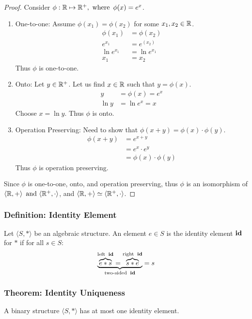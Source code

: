 \begin{proof}
    Consider $\phi: \mathbb{R} \mapsto \mathbb{R}^+, \operatorname{~\text{where}~} \phi(x) = e^x$.
    \begin{enumerate}
        \item One-to-one: Assume $\phi(x_1) = \phi(x_2)$ for some $x_1,x_2 \in \mathbb{R}$.
        \begin{align*}
            \phi(x_1) & = \phi(x_2) \\
            e^{x_1} & = e^(x_2) \\
            \ln e^{x_1} & = \ln e^{x_1} \\
            x_1 & = x_2
        \end{align*}
        Thus $\phi$ is one-to-one.
        \item Onto: Let $y \in \mathbb{R}^+$. Let us find $x \in \mathbb{R}$ such that $y = \phi(x)$.
        \begin{align*}
            y & = \phi(x) = e^x \\
            \ln y & = \ln e^x = x
        \end{align*}
        Choose $x = \ln y$. Thus $\phi$ is onto.
        \item Operation Preserving: Need to show that $\phi(x + y) = \phi(x) \cdot \phi(y)$.
        \begin{align*}
            \phi(x+y) & = e^{x+y} \\
            & = e^x \cdot e^y \\
            & = \phi(x) \cdot \phi(y)
        \end{align*}
        Thus $\phi$ is operation preserving.
    \end{enumerate}
    Since $\phi$ is one-to-one, onto, and operation preserving, thus $\phi$ is an isomorphism of $\langle \mathbb{R},+\rangle \operatorname{~\text{and}~} \langle \mathbb{R}^+, \cdot \rangle$, and $\langle \mathbb{R},+\rangle \simeq \langle \mathbb{R}^+, \cdot \rangle$.
\end{proof}

\subsubsection*{Definition: Identity Element}
Let $\langle S, * \rangle$ be an algebraic structure. An element $e \in S$ is the identity element $\operatorname{\textbf{id}}$ for $*$ if for all $s \in S$:
\[
    \underbrace{\overbrace{e * s}^{\text{left}~\operatorname{\textbf{id}}} = \overbrace{s * e}^{\text{right}~\operatorname{\textbf{id}}}}_{\text{two-sided}~\operatorname{\textbf{id}}} = s
\]

\subsubsection*{Theorem: Identity Uniqueness}
A binary structure $\langle S, * \rangle$ has at most one identity element.

